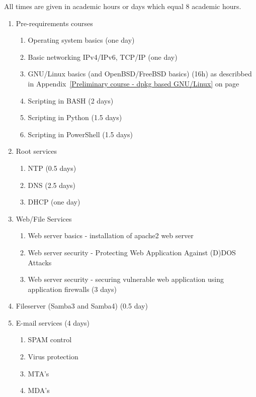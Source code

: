 All times are given in academic hours or days which equal 8 academic hours.
\begin{enumerate}[label=Hands-on block \arabic*.,leftmargin=*]
  \item Pre-requirements courses
    \begin{enumerate}[label=LAB \arabic*.,leftmargin=*]
  	\item Operating system basics (one day)
  	\item Basic networking IPv4/IPv6, TCP/IP (one day)
  	\item GNU/Linux basics (and OpenBSD/FreeBSD basics) (16h) as describbed in Appendix~\ref{Preliminary course - dpkg based GNU/Linux} on page~\pageref{Preliminary course - dpkg based GNU/Linux}
  	\item Scripting in BASH (2 days)
  	\item Scripting in Python (1.5 days)
  	\item Scripting in PowerShell (1.5 days)
  \end{enumerate}
  \item Root services
  \begin{enumerate}[label=LAB \arabic*.,leftmargin=*]
  	\item NTP (0.5 days)
  	\item DNS (2.5 days)
  	\item DHCP (one day)
  \end{enumerate}
  \item Web/File Services
    \begin{enumerate}[label=LAB \arabic*.,leftmargin=*]
    \item Web server basics - installation of apache2 web server
  	\item Web server security - Protecting Web Application Against
(D)DOS Attacks
  	\item Web server security - securing vulnerable web application using application firewalls (3 days)
  	\end{enumerate}
  	\item Fileserver (Samba3 and Samba4) (0.5 day)
    \item E-mail services (4 days)
    \begin{enumerate}[label=LAB \arabic*.,leftmargin=*]
  		\item SPAM control
	  	\item Virus protection
  		\item MTA's 
	  	\item MDA's
    \end{enumerate}

\end{enumerate}
